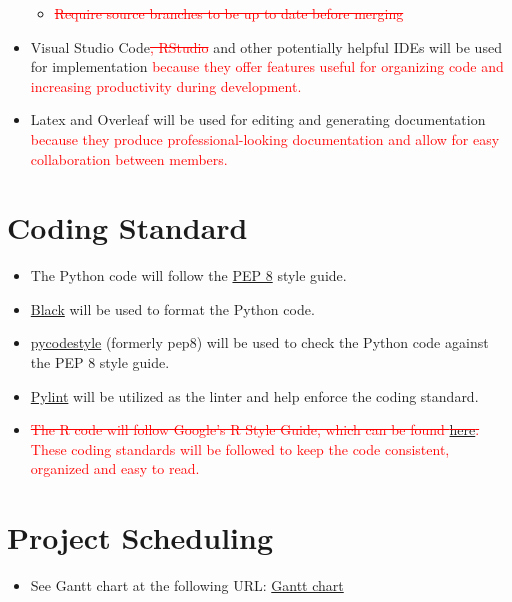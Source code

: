 \documentclass{article}
\begin{document}
\begin{itemize}
\begin{itemize}
        \item \textcolor{red}{\sout{Require source branches to be up to date before merging}}
    \end{itemize}
\item Visual Studio Code\textcolor{red}{\sout{, RStudio}} and other potentially helpful IDEs will be used for implementation \textcolor{red}{because they offer features useful for organizing code and increasing productivity during development.}
\item Latex and Overleaf will be used for editing and generating documentation \textcolor{red}{because they produce professional-looking documentation and allow for easy collaboration between members.}

\end{itemize}

\section{Coding Standard}
\begin{itemize}
    \item The Python code will follow the \href{https://peps.python.org/pep-0008/}{PEP 8} style guide.
    \item \href{https://pypi.org/project/black/}{Black} will be used to format the Python code.
    \item \href{https://pypi.org/project/pycodestyle/}{pycodestyle} (formerly pep8) will be used to check the Python code against the PEP 8 style guide.
    \item \href{https://pypi.org/project/pylint/}{Pylint} will be utilized as the linter and help enforce the coding standard.
    \item \textcolor{red}{\sout{The R code will follow Google's R Style Guide, which can be found \href{https://google.github.io/styleguide/Rguide.html}{here}.}}
    \textcolor{red}{These coding standards will be followed to keep the code consistent, organized and easy to read.}
\end{itemize}

\section{Project Scheduling}
\begin{itemize}
    \item See Gantt chart at the following URL:  \href{https://github.com/paezha/PyERT-BLACK/tree/main/docs/Project%20Schedule}{Gantt chart}
\end{itemize}
\end{document}
